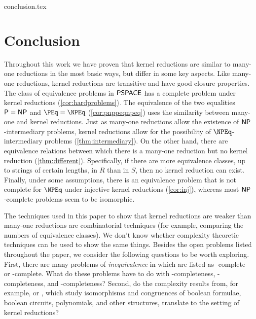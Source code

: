 \begin{filecontents}{conclusion.tex}
\section{Conclusion}
%
Throughout this work we have proven that kernel reductions are similar to many-one reductions in the most basic ways, but differ in some key aspects.
Like many-one reductions, kernel reductions are transitive and have good closure properties.
The class of equivalence problems in $\PSPACE$ has a complete problem under kernel reductions (\ref{cor:hardproblems}).
The equivalence of the two equalities $\P = \NP$ and $\PEq = \NPEq$ (\ref{cor:pnppeqnpeq}) uses the similarity between many-one and kernel reductions.
Just as many-one reductions allow the existence of $\NP$-intermediary problems, kernel reductions allow for the possibility of $\NPEq$-intermediary problems (\ref{thm:intermediary}).
On the other hand, there are equivalence relations between which there is a many-one reduction but no kernel reduction (\ref{thm:different}).
Specifically, if there are more equivalence classes, up to strings of certain lengths, in $R$ than in $S$, then no kernel reduction can exist.
Finally, under some assumptions, there is an equivalence problem that is not complete for $\NPEq$ under injective kernel reductions (\ref{cor:inj}), whereas most $\NP$-complete problems seem to be isomorphic.

The techniques used in this paper to show that kernel reductions are weaker than many-one reductions are combinatorial techniques (for example, comparing the numbers of equivalence classes).
We don't know whether complexity theoretic techniques can be used to show the same things.
Besides the open problems listed throughout the paper, we consider the following questions to be worth exploring.
First, there are many problems of \emph{inequivalence} in \cite{gj79} which are listed as \NP-complete or \PSPACE-complete.
What do these problems have to do with \NPEq-completeness, \coNPEq-completeness, and \PSPACEEq-completeness?
Second, do the complexity results from, for example, \cite{at96} or \cite{rs11}, which study isomorphisms and congruences of boolean formulae, boolean circuits, polynomials, and other structures, translate to the setting of kernel reductions?
\end{filecontents}
